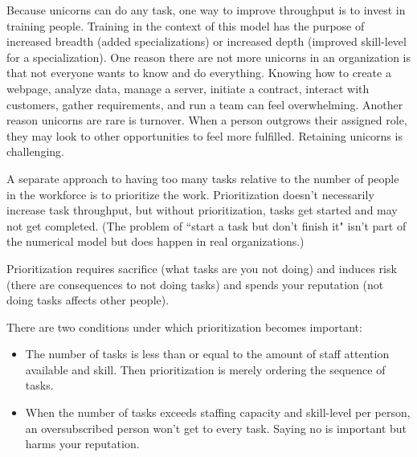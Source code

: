 
Because unicorns can do any task, one way to improve throughput is to invest in training people. Training in the context of this model has the purpose of  increased breadth (added specializations) or increased depth (improved skill-level for a specialization). One reason there are not more unicorns in an organization is that not everyone wants to know and do everything. Knowing how to create a webpage, analyze data, manage a server, initiate a contract, interact with customers, gather requirements, and run a team can feel overwhelming. Another reason unicorns are rare is turnover. When a person outgrows their assigned role,  they may look to other opportunities to feel more fulfilled. Retaining unicorns is challenging.

A separate approach to having too many tasks relative to the number of people in the workforce is to prioritize the work. Prioritization doesn't necessarily increase task throughput, but without prioritization, tasks get started and may not get completed. (The problem of ``start a task but don't finish it" isn't part of the numerical model but does happen in real organizations.)

Prioritization requires sacrifice (what tasks are you not doing) and induces risk (there are consequences to not doing tasks) and spends your reputation (not doing tasks affects other people).

There are two conditions under which prioritization becomes important:
\begin{itemize}
    \item The number of tasks is less than or equal to the amount of staff attention available and skill. Then prioritization is merely ordering the sequence of tasks.
    \item When the number of tasks exceeds staffing capacity and skill-level per person, an oversubscribed person won't get to every task. Saying no is important but harms your reputation.
\end{itemize}


